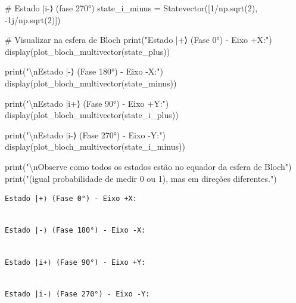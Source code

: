 \documentclass[
  brazilian,
]{report}
\newenvironment{Shaded}{\begin{snugshade}}{\end{snugshade}}
\newcommand{\BuiltInTok}[1]{\textcolor[rgb]{0.00,0.23,0.31}{#1}}
\newcommand{\CharTok}[1]{\textcolor[rgb]{0.13,0.47,0.30}{#1}}
\newcommand{\CommentTok}[1]{\textcolor[rgb]{0.37,0.37,0.37}{#1}}
\newcommand{\DecValTok}[1]{\textcolor[rgb]{0.68,0.00,0.00}{#1}}
\newcommand{\NormalTok}[1]{\textcolor[rgb]{0.00,0.23,0.31}{#1}}
\newcommand{\OperatorTok}[1]{\textcolor[rgb]{0.37,0.37,0.37}{#1}}
\newcommand{\OtherTok}[1]{\textcolor[rgb]{0.00,0.23,0.31}{#1}}
\newcommand{\StringTok}[1]{\textcolor[rgb]{0.13,0.47,0.30}{#1}}
\begin{document}
\begin{tcolorbox}
\begin{Shaded}
\begin{Highlighting}[]
\CommentTok{\# Estado |i{-}⟩ (fase 270°)}
\NormalTok{state\_i\_minus }\OperatorTok{=}\NormalTok{ Statevector([}\DecValTok{1}\OperatorTok{/}\NormalTok{np.sqrt(}\DecValTok{2}\NormalTok{), }\OperatorTok{{-}}\OtherTok{1j}\OperatorTok{/}\NormalTok{np.sqrt(}\DecValTok{2}\NormalTok{)])}

\CommentTok{\# Visualizar na esfera de Bloch}
\BuiltInTok{print}\NormalTok{(}\StringTok{"Estado |+⟩ (Fase 0°) {-} Eixo +X:"}\NormalTok{)}
\NormalTok{display(plot\_bloch\_multivector(state\_plus))}

\BuiltInTok{print}\NormalTok{(}\StringTok{"}\CharTok{\textbackslash{}n}\StringTok{Estado |{-}⟩ (Fase 180°) {-} Eixo {-}X:"}\NormalTok{)}
\NormalTok{display(plot\_bloch\_multivector(state\_minus))}

\BuiltInTok{print}\NormalTok{(}\StringTok{"}\CharTok{\textbackslash{}n}\StringTok{Estado |i+⟩ (Fase 90°) {-} Eixo +Y:"}\NormalTok{)}
\NormalTok{display(plot\_bloch\_multivector(state\_i\_plus))}

\BuiltInTok{print}\NormalTok{(}\StringTok{"}\CharTok{\textbackslash{}n}\StringTok{Estado |i{-}⟩ (Fase 270°) {-} Eixo {-}Y:"}\NormalTok{)}
\NormalTok{display(plot\_bloch\_multivector(state\_i\_minus))}

\BuiltInTok{print}\NormalTok{(}\StringTok{"}\CharTok{\textbackslash{}n}\StringTok{Observe como todos os estados estão no equador da esfera de Bloch"}\NormalTok{)}
\BuiltInTok{print}\NormalTok{(}\StringTok{"(igual probabilidade de medir 0 ou 1), mas em direções diferentes."}\NormalTok{)}
\end{Highlighting}
\end{Shaded}

\end{tcolorbox}

\begin{verbatim}
Estado |+⟩ (Fase 0°) - Eixo +X:
\end{verbatim}

\begin{verbatim}

Estado |-⟩ (Fase 180°) - Eixo -X:
\end{verbatim}

\begin{verbatim}

Estado |i+⟩ (Fase 90°) - Eixo +Y:
\end{verbatim}

\begin{verbatim}

Estado |i-⟩ (Fase 270°) - Eixo -Y:
\end{verbatim}
\end{document}
